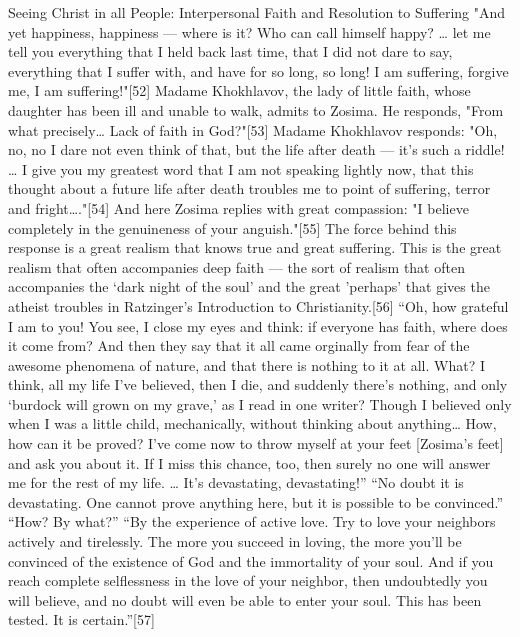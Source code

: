 Seeing Christ in all People: Interpersonal Faith and Resolution to Suffering
"And yet happiness, happiness — where is it? Who can call himself happy? … let me tell you everything that I held back last time, that I did not dare to say, everything that I suffer with, and have for so long, so long! I am suffering, forgive me, I am suffering!"[52] Madame Khokhlavov, the lady of little faith, whose daughter has been ill and unable to walk, admits to Zosima. He responds, "From what precisely… Lack of faith in God?"[53]
Madame Khokhlavov responds: "Oh, no, no I dare not even think of that, but the life after death — it's such a riddle! … I give you my greatest word that I am not speaking lightly now, that this thought about a future life after death troubles me to point of suffering, terror and fright…."[54] And here Zosima replies with great compassion: "I believe completely in the genuineness of your anguish."[55] The force behind this response is a great realism that knows true and great suffering. This is the great realism that often accompanies deep faith — the sort of realism that often accompanies the ‘dark night of the soul’ and the great 'perhaps' that gives the atheist troubles in Ratzinger's Introduction to Christianity.[56] 
“Oh, how grateful I am to you! You see, I close my eyes and think: if everyone has faith, where does it come from? And then they say that it all came orginally from fear of the awesome phenomena of nature, and that there is nothing to it at all. What? I think, all my life I’ve believed, then I die, and suddenly there’s nothing, and only ‘burdock will grown on my grave,’ as I read in one writer? Though I believed only when I was a little child, mechanically, without thinking about anything… How, how can it be proved? I’ve come now to throw myself at your feet [Zosima’s feet] and ask you about it. If I miss this chance, too, then surely no one will answer me for the rest of my life. … It’s devastating, devastating!”
“No doubt it is devastating. One cannot prove anything here, but it is possible to be convinced.”
“How? By what?”
“By the experience of active love. Try to love your neighbors actively and tirelessly. The more you succeed in loving, the more you’ll be convinced of the existence of God and the immortality of your soul. And if you reach complete selflessness in the love of your neighbor, then undoubtedly you will believe, and no doubt will even be able to enter your soul. This has been tested. It is certain.”[57]
